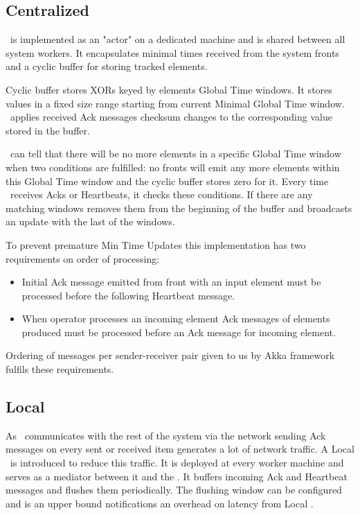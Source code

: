 \subsection{Centralized \tracker\ }

\tracker\ is implemented as an "actor" on a dedicated machine and is shared between all system workers. It encapsulates minimal times received from the system fronts and a cyclic buffer for storing tracked elements.

Cyclic buffer stores XORs keyed by elements Global Time windows. It stores values in a fixed size range starting from current Minimal Global Time window. \tracker\ applies received Ack messages checksum changes to the corresponding value stored in the buffer.

\tracker\ can tell that there will be no more elements in a specific Global Time window when two conditions are fulfilled: no fronts will emit any more elements within this Global Time window and the cyclic buffer stores zero for it. Every time \tracker\ receives Acks or Heartbeats, it checks these conditions. If there are any matching windows \tracker removes them from the beginning of the buffer and broadcasts an update with the last of the windows.

To prevent premature Min Time Updates this implementation has two requirements on order of processing:

\begin{itemize}
	\item Initial Ack message emitted from front with an input element must be processed before the following Heartbeat message.
	\item When operator processes an incoming element Ack messages of elements produced must be processed before an Ack message for incoming element.
\end{itemize}

Ordering of messages per sender-receiver pair given to us by Akka framework fulfils these requirements.

\subsection{Local \tracker\ }

As \tracker\ communicates with the rest of the system via the network sending Ack messages on every sent or received item generates a lot of network traffic. A Local \tracker\ is introduced to reduce this traffic. It is deployed at every worker machine and serves as a mediator between it and the \tracker. It buffers incoming Ack and Heartbeat messages and flushes them periodically. The flushing window can be configured and  is an upper bound notifications an overhead on latency from Local \tracker.

